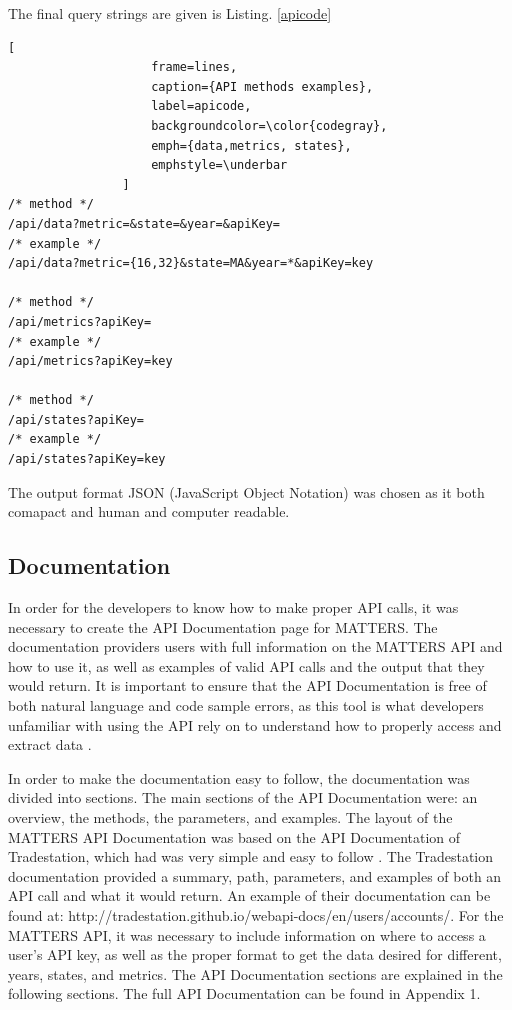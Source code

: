 				The final query strings are given is Listing. \ref{apicode}
				
				\begin{lstlisting}[
					frame=lines,
					caption={API methods examples}, 
					label=apicode, 
					backgroundcolor=\color{codegray}, 
					emph={data,metrics, states},
					emphstyle=\underbar
				]
/* method */
/api/data?metric=&state=&year=&apiKey=
/* example */
/api/data?metric={16,32}&state=MA&year=*&apiKey=key

/* method */
/api/metrics?apiKey=
/* example */
/api/metrics?apiKey=key

/* method */
/api/states?apiKey=
/* example */
/api/states?apiKey=key
				\end{lstlisting}
				
				The output format JSON (JavaScript Object Notation) was chosen
				as it both comapact and human and computer readable. 
				
			\subsection{Documentation}
				
				In order for the developers to know how to make proper API calls, 
				it was necessary to create the API Documentation page for MATTERS. 
				The documentation providers users with full information on the MATTERS API 
				and how to use it, as well as examples of valid API calls and the output 
				that they would return. It is important to ensure that the API Documentation 
				is free of both natural language and code sample errors, as this tool is 
				what developers unfamiliar with using the API rely on to understand how 
				to properly access and extract data \cite{errors}. 
				
				In order to make the documentation easy to follow, the documentation was divided into sections. 
				The main sections of the API Documentation were: an overview, the methods, 
				the parameters, and examples. The layout of the MATTERS API Documentation was based on the 
				API Documentation of Tradestation, which had was very simple and easy to follow \cite{apiex}. 
				The Tradestation documentation provided a summary, path, parameters, and examples of both an 
				API call and what it would return. An example of their documentation can be found at: 
				http://tradestation.github.io/webapi-docs/en/users/accounts/. For the MATTERS API, 
				it was necessary to include information on where to access a user's API key, 
				as well as the proper format to get the data desired for different, years, states, 
				and metrics. The API Documentation sections are explained in the following sections. 
				The full API Documentation can be found in Appendix 1.
				
